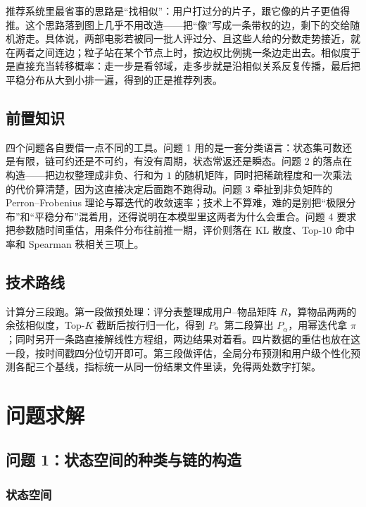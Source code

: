 \documentclass[12pt,a4paper]{ctexart}
\begin{document}
推荐系统里最省事的思路是“找相似”\cite{jeh,fouss}：用户打过分的片子，跟它像的片子更值得推。这个思路落到图上几乎不用改造——把“像”写成一条带权的边，剩下的交给随机游走。具体说，两部电影若被同一批人评过分、且这些人给的分数走势接近，就在两者之间连边；粒子站在某个节点上时，按边权比例挑一条边走出去。相似度于是直接充当转移概率：走一步是看邻域，走多步就是沿相似关系反复传播，最后把平稳分布从大到小排一遍，得到的正是推荐列表。

\subsection{前置知识}

四个问题各自要借一点不同的工具。问题 1 用的是一套分类语言：状态集可数还是有限，链可约还是不可约，有没有周期，状态常返还是瞬态。问题 2 的落点在构造——把边权整理成非负、行和为 $1$ 的随机矩阵，同时把稀疏程度和一次乘法的代价算清楚，因为这直接决定后面跑不跑得动。问题 3 牵扯到非负矩阵的 Perron--Frobenius 理论\cite{pf}与幂迭代的收敛速率\cite{levin}；技术上不算难，难的是别把“极限分布”和“平稳分布”混着用，还得说明在本模型里这两者为什么会重合。问题 4 要求把参数随时间重估，用条件分布往前推一期，评价则落在 KL 散度、Top-10 命中率和 Spearman 秩相关三项上。

\subsection{技术路线}

计算分三段跑。第一段做预处理：评分表整理成用户--物品矩阵 $R$，算物品两两的余弦相似度，Top-$K$ 截断后按行归一化，得到 $P$。第二段算出 $P_{\alpha}$，用幂迭代拿 $\pi$；同时另开一条路直接解线性方程组，两边结果对着看。四片数据的重估也放在这一段，按时间戳四分位切开即可。第三段做评估，全局分布预测和用户级个性化预测各配三个基线，指标统一从同一份结果文件里读，免得两处数字打架。

\section{问题求解}

\subsection{问题 1：状态空间的种类与链的构造}

\subsubsection{状态空间}
\end{document}
